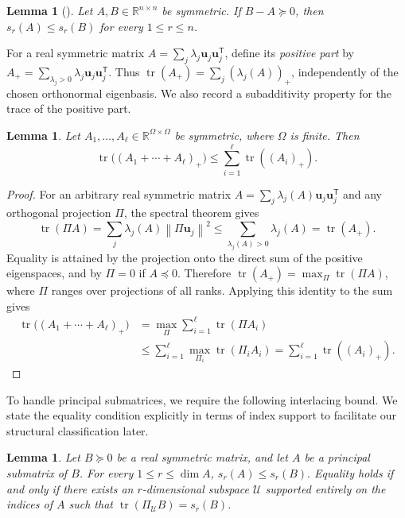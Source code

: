 \documentclass[11pt]{article}
\newtheorem{lemma}[theorem]{Lemma}
\newcommand{\R}{\mathbb{R}}
\newcommand{\tr}{\operatorname{tr}}
\newcommand{\norm}[1]{\left\lVert #1\right\rVert}
\newcommand{\scrU}{\mathscr{U}}
\begin{document}
	\begin{lemma}[\cite{Bhatia}]\label{lem:kyfan-monotone}
		Let \(A,B\in\R^{n\times n}\) be symmetric. If \(B-A\succeq 0\), then
		\(s_r(A) \le s_r(B)\)
		for every \(1\le r\le n\).
	\end{lemma}
	
	For a real symmetric matrix
	\(A=\sum_j\lambda_j\mathbf u_j\mathbf u_j^{\mathsf T}\), define its
	\emph{positive part} by
	$A_+=\sum_{\lambda_j>0}\lambda_j\mathbf u_j\mathbf u_j^{\mathsf T}.$
	Thus \(\tr(A_+)=\sum_j(\lambda_j(A))_+\), independently of the
	chosen orthonormal eigenbasis.
We also record a subadditivity property for the trace of the positive part.
	
	\begin{lemma}\label{lem:positive-part}
		Let \(A_1,\ldots,A_\ell\in\R^{\Omega\times\Omega}\) be symmetric,
		where \(\Omega\) is finite. Then
		\[
		\tr\bigl((A_1+\cdots+A_\ell)_+\bigr)
		\le
		\sum_{i=1}^\ell \tr((A_i)_+).
		\]
	\end{lemma}
	
	\begin{proof}
		For an arbitrary real symmetric matrix
		\(A=\sum_j\lambda_j(A)\mathbf u_j\mathbf u_j^{\mathsf T}\) and any orthogonal
		projection \(\Pi\), the spectral theorem gives
		\[
		\tr(\Pi A)=\sum_j\lambda_j(A)\norm{\Pi\mathbf u_j}^2
		\le\sum_{\lambda_j(A)>0}\lambda_j(A)=\tr(A_+).
		\]
		Equality is attained by the projection onto the direct sum of the
		positive eigenspaces, and by \(\Pi=0\) if \(A\preceq0\).  Therefore
		\(\tr(A_+)=\max_\Pi\tr(\Pi A)\), where \(\Pi\) ranges over projections of
		all ranks.  Applying this identity to the sum gives
		\begin{align*}
			\tr\bigl((A_1+\cdots+A_\ell)_+\bigr)
			&=\max_\Pi\sum_{i=1}^\ell\tr(\Pi A_i)\\
			&\le\sum_{i=1}^\ell\max_{\Pi_i}\tr(\Pi_iA_i)
			=\sum_{i=1}^\ell\tr((A_i)_+).
		\end{align*}
	\end{proof}

To handle principal submatrices, we require the following interlacing bound.
We state the equality condition explicitly in terms of index support to facilitate our structural classification later.
	
	\begin{lemma}\label{lem:compression-equality}
		Let \(B\succeq0\) be a real symmetric matrix, and let \(A\) be a principal submatrix of \(B\).
		For every \(1\le r\le\dim A\), $s_r(A)\le s_r(B).$
		Equality holds if and only if there exists an \(r\)-dimensional subspace \(\scrU\) supported entirely on the indices of \(A\) such that \(\tr(\Pi_{\scrU}B)=s_r(B)\).
	\end{lemma}
	
\end{document}
